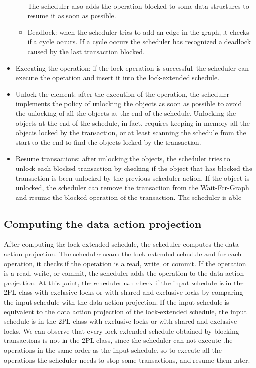 \documentclass{article}
\begin{document}
\begin{itemize}
\begin{itemize}
        \\
        The scheduler also adds the operation blocked to some data structures to resume it as soon as possible.
        \item Deadlock: when the scheduler tries to add an edge in the graph, it checks if a cycle occurs. If a cycle occurs the scheduler has recognized a deadlock caused by the last transaction blocked.
    \end{itemize}
    \item Executing the operation: if the lock operation is successful, the scheduler can execute the operation and insert it into the lock-extended schedule.
    \item Unlock the element: after the execution of the operation, the scheduler implements the policy of unlocking the objects as soon as possible to avoid the unlocking of all the objects at the end of the schedule. Unlocking the objects at the end of the schedule, in fact, requires keeping in memory all the objects locked by the transaction, or at least scanning the schedule from the start to the end to find the objects locked by the transaction.
    \item Resume transactions: after unlocking the objects, the scheduler tries to unlock each blocked transaction by checking if the object that has blocked the transaction is been unlocked by the previous scheduler action. If the object is unlocked, the scheduler can remove the transaction from the Wait-For-Graph and resume the blocked operation of the transaction. The scheduler is able 
\end{itemize}
\subsection{Computing the data action projection}
After computing the lock-extended schedule, the scheduler computes the data action projection. The scheduler scans the lock-extended schedule and for each operation, it checks if the operation is a read, write, or commit. If the operation is a read, write, or commit, the scheduler adds the operation to the data action projection. At this point, the scheduler can check if the input schedule is in the 2PL class with exclusive locks or with shared and exclusive locks by comparing the input schedule with the data action projection. If the input schedule is equivalent to the data action projection of the lock-extended schedule, the input schedule is in the 2PL class with exclusive locks or with shared and exclusive locks. We can observe that every lock-extended schedule obtained by blocking transactions is not in the 2PL class, since the scheduler can not execute the operations in the same order as the input schedule, so to execute all the operations the scheduler needs to stop some transactions, and resume them later.
\end{document}
